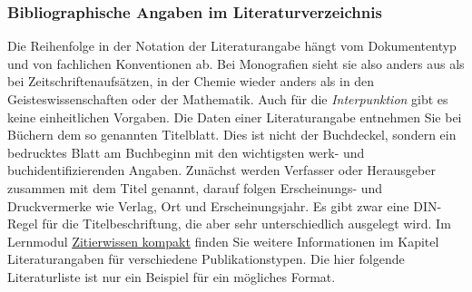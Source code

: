 \documentclass[a4paper,11pt]{article}%
\renewcommand{\\}{\vspace*{0.5\baselineskip} \newline}
\begin{document}
\subsubsection{Bibliographische Angaben im Literaturverzeichnis}
Die Reihenfolge in der Notation der Literaturangabe hängt vom Dokumententyp und von fachlichen Konventionen ab. Bei Monografien sieht sie also anders aus als bei Zeitschriftenaufsätzen, in der Chemie wieder anders als in den Geisteswissenschaften oder der Mathematik. Auch für die \textit{Interpunktion} gibt es keine einheitlichen Vorgaben.\\ 
Die Daten einer Literaturangabe entnehmen Sie bei Büchern dem so genannten Titelblatt. Dies ist nicht der Buchdeckel, sondern ein bedrucktes Blatt am Buchbeginn mit den wichtigsten werk- und buchidentifizierenden Angaben. Zunächst werden Verfasser oder Herausgeber zusammen mit dem Titel genannt, darauf folgen Erscheinungs- und Druckvermerke wie Verlag, Ort und Erscheinungsjahr. Es gibt zwar eine DIN-Regel für die Titelbeschriftung, die aber sehr unterschiedlich ausgelegt wird.\\
Im Lernmodul \href{https://ilias.th-koeln.de/ilias.php?baseClass=ilRepositoryGUI}{\underline{Zitierwissen kompakt}} finden Sie weitere Informationen im Kapitel Literaturangaben für verschiedene Publikationstypen. Die hier folgende Literaturliste ist nur ein Beispiel für ein mögliches Format.
\newpage
\end{document}
